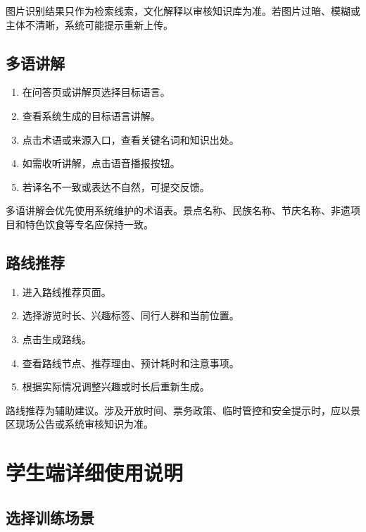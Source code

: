 图片识别结果只作为检索线索，文化解释以审核知识库为准。若图片过暗、模糊或主体不清晰，系统可能提示重新上传。


\subsection{多语讲解}

\begin{enumerate}[leftmargin=2em]
  \item 在问答页或讲解页选择目标语言。
  \item 查看系统生成的目标语言讲解。
  \item 点击术语或来源入口，查看关键名词和知识出处。
  \item 如需收听讲解，点击语音播报按钮。
  \item 若译名不一致或表达不自然，可提交反馈。
\end{enumerate}

多语讲解会优先使用系统维护的术语表。景点名称、民族名称、节庆名称、非遗项目和特色饮食等专名应保持一致。


\subsection{路线推荐}

\begin{enumerate}[leftmargin=2em]
  \item 进入路线推荐页面。
  \item 选择游览时长、兴趣标签、同行人群和当前位置。
  \item 点击生成路线。
  \item 查看路线节点、推荐理由、预计耗时和注意事项。
  \item 根据实际情况调整兴趣或时长后重新生成。
\end{enumerate}

路线推荐为辅助建议。涉及开放时间、票务政策、临时管控和安全提示时，应以景区现场公告或系统审核知识为准。


\section{学生端详细使用说明}

\subsection{选择训练场景}

